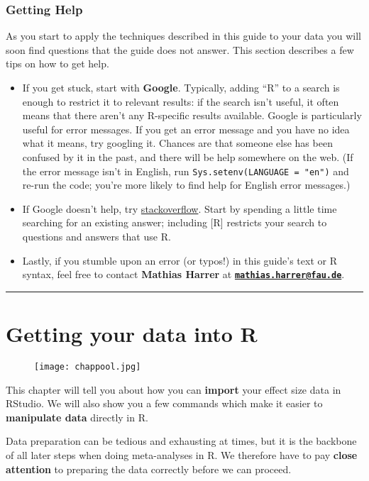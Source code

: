 \documentclass[]{book}
\providecommand{\tightlist}{%
  \setlength{\itemsep}{0pt}\setlength{\parskip}{0pt}}
\theoremstyle{definition}
\theoremstyle{definition}
\theoremstyle{definition}
\theoremstyle{remark}
\begin{document}
\subsection{Getting Help}\label{getting-help}

As you start to apply the techniques described in this guide to your
data you will soon find questions that the guide does not answer. This
section describes a few tips on how to get help.

\begin{itemize}
\tightlist
\item
  If you get stuck, start with \textbf{Google}. Typically, adding ``R''
  to a search is enough to restrict it to relevant results: if the
  search isn't useful, it often means that there aren't any R-specific
  results available. Google is particularly useful for error messages.
  If you get an error message and you have no idea what it means, try
  googling it. Chances are that someone else has been confused by it in
  the past, and there will be help somewhere on the web. (If the error
  message isn't in English, run \texttt{Sys.setenv(LANGUAGE\ =\ "en")}
  and re-run the code; you're more likely to find help for English error
  messages.)
\item
  If Google doesn't help, try
  \href{https://stackoverflow.com}{stackoverflow}. Start by spending a
  little time searching for an existing answer; including {[}R{]}
  restricts your search to questions and answers that use R.
\item
  Lastly, if you stumble upon an error (or typos!) in this guide's text
  or R syntax, feel free to contact \textbf{Mathias Harrer} at
  \textbf{\href{mailto:mathias.harrer@fau.de}{\nolinkurl{mathias.harrer@fau.de}}}.
\end{itemize}

\begin{center}\rule{0.5\linewidth}{\linethickness}\end{center}

\chapter{Getting your data into R}\label{getting-your-data-into-r}

\begin{figure}
\centering
\texttt{[image: chappool.jpg]}
\caption{}
\end{figure}

\begin{rmdinfo}
This chapter will tell you about how you can \textbf{import} your effect
size data in RStudio. We will also show you a few commands which make it
easier to \textbf{manipulate data} directly in R.

Data preparation can be tedious and exhausting at times, but it is the
backbone of all later steps when doing meta-analyses in R. We therefore
have to pay \textbf{close attention} to preparing the data correctly
before we can proceed.
\end{rmdinfo}
\end{document}
